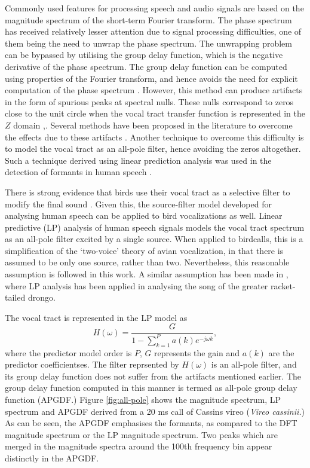 \documentclass[a4paper]{article}
\begin{document}
Commonly used features for processing speech and audio signals are based on the
magnitude spectrum of the short-term Fourier transform. The phase spectrum has
received relatively lesser attention due to signal processing difficulties, one
of them being the need to unwrap the phase spectrum. The unwrapping problem can
be bypassed by utilising the group delay function, which is the negative
derivative of the phase spectrum. The group delay function can be computed using
properties of the Fourier transform, and hence avoids the need for explicit
computation of the phase spectrum \cite{gdDeriv}.  However, this method can
produce artifacts in the form of spurious peaks at spectral nulls. These nulls
correspond to zeros close to the unit circle when the vocal tract transfer
function is represented in the $Z$ domain \cite{hemaSigProc1989},\cite{chirpGd}.
Several methods have been proposed in the literature to overcome the effects due
to these artifacts \cite{modgdf} \cite{productSpectrum} \cite{chirpGd}. Another
technique to overcome this difficulty is to model the vocal tract as an all-pole
filter, hence avoiding the zeros altogether. Such a technique derived using
linear prediction analysis was used in the detection of formants in human speech
\cite{yegnaFormant}. 

There is strong evidence that birds use their vocal tract as a selective filter
to modify the final sound \cite{catchpole}.  Given this, the source-filter model
developed for analysing human speech can be applied to bird vocalizations as
well.  Linear predictive (LP) analysis of human speech signals models the vocal
tract spectrum as an all-pole filter \cite{makhoul} excited by a single source.
When applied to birdcalls, this is a simplification of the `two-voice' theory of
avian vocalization\cite{catchpole}, in that there is assumed to be only one
source, rather than two. Nevertheless, this reasonable assumption is followed in
this work. A similar assumption has been made in \cite{agnihotri}, where LP
analysis has been applied in analysing the song of the greater racket-tailed
drongo.

The vocal tract is represented in the LP model as
\begin{equation}
\label{eq:1}
H(\omega) = \frac{G}{1-\sum_{k=1}^{P} a(k) e^{-j \omega k}},
\end{equation}
where the predictor model order is $P$, $G$ represents the gain and $a(k)$ are
the predictor coefficientses\cite{makhoul}.
The filter reprsented by $H(\omega)$ is an all-pole filter, and its group delay
function does not suffer from the artifacts mentioned earlier. The group delay
function computed in this manner is termed as all-pole group delay
function (APGDF.) Figure \ref{fig:all-pole} shows the magnitude spectrum, LP
spectrum and APGDF derived from a 20 ms call of Cassins vireo (\textit{Vireo
cassinii.}) As can be seen, the APGDF emphasises the formants, as compared to the
DFT magnitude spectrum or the LP magnitude spectrum. Two peaks which are merged
in the magnitude spectra around the 100th frequency bin appear distinctly in the
APGDF.
\end{document}
